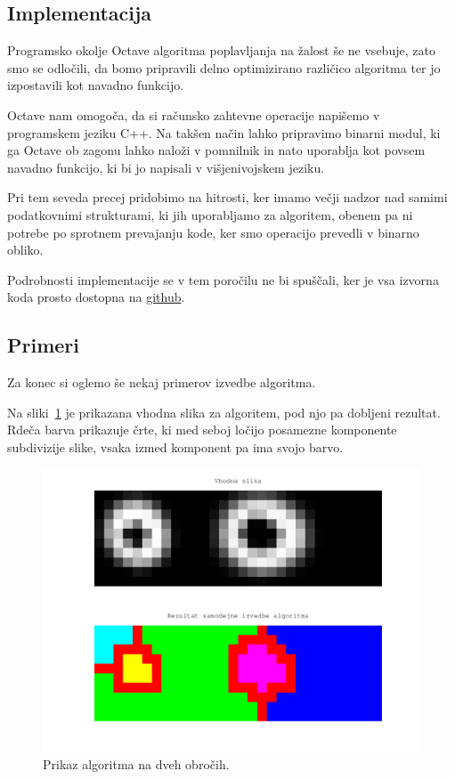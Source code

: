 \documentclass[a4paper, 11pt]{article}
\begin{document}
\subsection{Implementacija}

Programsko okolje Octave algoritma poplavljanja na žalost še ne vsebuje, zato smo se odločili, da bomo pripravili delno optimizirano različico algoritma ter jo izpostavili kot navadno funkcijo.

Octave nam omogoča, da si računsko zahtevne operacije napišemo v programskem jeziku C++. Na takšen način lahko pripravimo binarni modul, ki ga Octave ob zagonu lahko naloži v pomnilnik in nato uporablja kot povsem navadno funkcijo, ki bi jo napisali v višjenivojskem jeziku.

Pri tem seveda precej pridobimo na hitrosti, ker imamo večji nadzor nad samimi podatkovnimi strukturami, ki jih uporabljamo za algoritem, obenem pa ni potrebe po sprotnem prevajanju kode, ker smo operacijo prevedli v binarno obliko.

Podrobnosti implementacije se v tem poročilu ne bi spuščali, ker je vsa izvorna koda prosto dostopna na \url{github}.


\subsection{Primeri}

Za konec si oglemo še nekaj primerov izvedbe algoritma. 

Na sliki~\ref{img:t2-result} je prikazana vhodna slika za algoritem, pod njo pa dobljeni rezultat. Rdeča barva prikazuje črte, ki med seboj ločijo posamezne komponente subdivizije slike, vsaka izmed komponent pa ima svojo barvo.

\begin{figure}
  \centering
  \includegraphics[width=.8\textwidth]{t2-result}
  \caption{Prikaz algoritma na dveh obročih.}
  \label{img:t2-result}
\end{figure}
\end{document}
